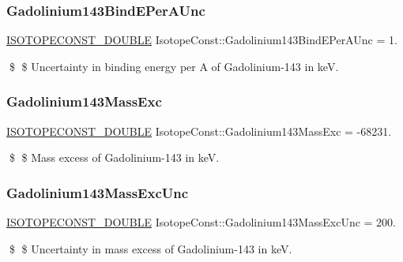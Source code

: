 \subsubsection{\texorpdfstring{Gadolinium143\+Bind\+E\+Per\+A\+Unc}{Gadolinium143BindEPerAUnc}}
{\footnotesize\ttfamily \mbox{\hyperlink{group___isotope_const-_macros_ga8f45a7272ce02c0b4c65c44636ed719a}{I\+S\+O\+T\+O\+P\+E\+C\+O\+N\+S\+T\+\_\+\+D\+O\+U\+B\+LE}} Isotope\+Const\+::\+Gadolinium143\+Bind\+E\+Per\+A\+Unc = 1.}

\$ \$ Uncertainty in binding energy per A of Gadolinium-\/143 in keV. \mbox{\label{group___isotope_const-_gadolinium-_gd143_gaf3edb4c40f49a1e61bf77e233f82550f}} 
\subsubsection{\texorpdfstring{Gadolinium143\+Mass\+Exc}{Gadolinium143MassExc}}
{\footnotesize\ttfamily \mbox{\hyperlink{group___isotope_const-_macros_ga8f45a7272ce02c0b4c65c44636ed719a}{I\+S\+O\+T\+O\+P\+E\+C\+O\+N\+S\+T\+\_\+\+D\+O\+U\+B\+LE}} Isotope\+Const\+::\+Gadolinium143\+Mass\+Exc = -\/68231.}

\$ \$ Mass excess of Gadolinium-\/143 in keV. \mbox{\label{group___isotope_const-_gadolinium-_gd143_ga69c88b9d325ee71bef364bdc06f5e064}} 
\subsubsection{\texorpdfstring{Gadolinium143\+Mass\+Exc\+Unc}{Gadolinium143MassExcUnc}}
{\footnotesize\ttfamily \mbox{\hyperlink{group___isotope_const-_macros_ga8f45a7272ce02c0b4c65c44636ed719a}{I\+S\+O\+T\+O\+P\+E\+C\+O\+N\+S\+T\+\_\+\+D\+O\+U\+B\+LE}} Isotope\+Const\+::\+Gadolinium143\+Mass\+Exc\+Unc = 200.}

\$ \$ Uncertainty in mass excess of Gadolinium-\/143 in keV. \mbox{\label{group___isotope_const-_gadolinium-_gd143_ga43a73a6679a36b76e6d49007fa0e9695}} 
